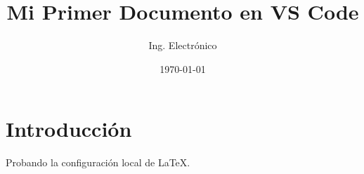 \documentclass{article}
\title{Mi Primer Documento en VS Code}
\author{Ing. Electrónico}
\date{\today}
\begin{document}
\maketitle

\section{Introducción}
Probando la configuración local de \LaTeX.
\end{document}
